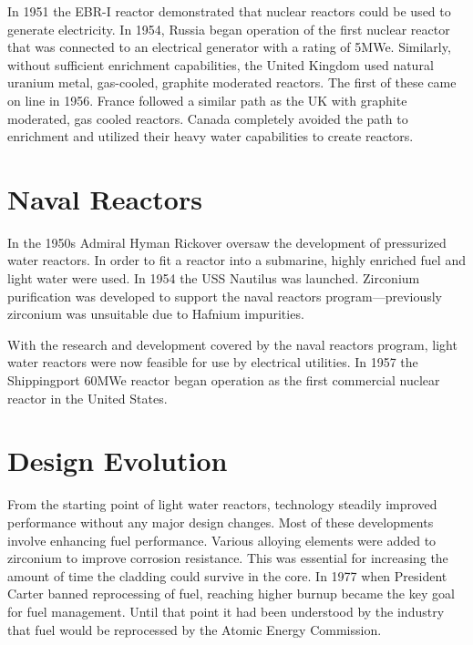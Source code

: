 
In 1951 the EBR-I reactor demonstrated that nuclear reactors could be used to generate electricity. %
In 1954, Russia began operation of the first nuclear reactor that was connected to an electrical generator with a rating of 5MWe.
Similarly, without sufficient enrichment capabilities, the United Kingdom used natural uranium metal, gas-cooled, graphite moderated reactors. The first of these came on line in 1956.
France followed a similar path as the UK with graphite moderated, gas cooled reactors. 
Canada completely avoided the path to enrichment and utilized their heavy water capabilities to create reactors. 

\section{Naval Reactors}
In the 1950s Admiral Hyman Rickover oversaw the development of pressurized water reactors. In order to fit a reactor into a submarine, highly enriched fuel and light water were used. In 1954 the USS Nautilus was launched. Zirconium purification was developed to support the naval reactors program---previously zirconium was unsuitable due to Hafnium impurities. 

With the research and development covered by the naval reactors program, light water reactors were now feasible for use by electrical utilities. In 1957 the Shippingport 60MWe reactor began operation as the first commercial nuclear reactor in the United States. %

\section{Design Evolution}
From the starting point of light water reactors, technology steadily improved performance without any major design changes. Most of these developments involve enhancing fuel performance. 
Various alloying elements were added to zirconium to improve corrosion resistance. This was essential for increasing the amount of time the cladding could survive in the core. 
In 1977 when President Carter banned reprocessing of fuel, reaching higher burnup became the key goal for fuel management. Until that point it had been understood by the industry that fuel would be reprocessed by the Atomic Energy Commission.

